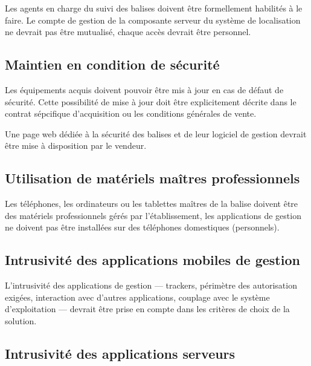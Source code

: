 \documentclass[headings=small,cmyk,french,a4paper,twocolumn,garamond,11pt]{scrartcl}
\begin{document}
Les agents en charge du suivi des balises doivent être formellement
habilités à le faire. Le compte de gestion de la composante serveur du
système de localisation ne devrait pas être mutualisé, chaque accès
devrait être personnel.
\subsection{Maintien en condition de sécurité}

Les équipements acquis doivent pouvoir être mis à jour en cas de
défaut de sécurité. Cette possibilité de mise à jour doit être
explicitement décrite dans le contrat sépcifique d'acquisition ou les
conditions générales de vente.

Une page web dédiée à la sécurité des balises et de leur logiciel de
gestion devrait être mise à disposition par le vendeur.

\subsection{Utilisation de matériels maîtres professionnels}

Les téléphones, les ordinateurs ou les tablettes maîtres de la balise
doivent être des matériels professionnels gérés par l'établissement,
les applications de gestion ne doivent pas être installées sur des
téléphones domestiques (personnels).
\subsection{Intrusivité des applications mobiles de gestion}

L'intrusivité des applications de gestion --- trackers, périmètre des
autorisation exigées, interaction avec d'autres applications, couplage
avec le système d'exploitation --- devrait être prise en compte dans les
critères de choix de la solution.

\subsection{Intrusivité des applications serveurs}
\end{document}
